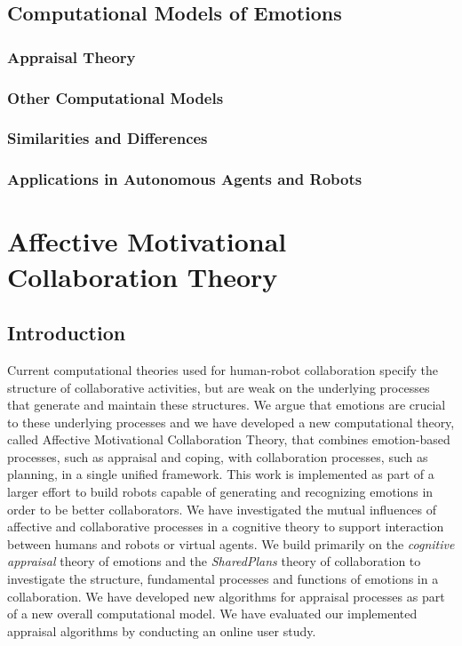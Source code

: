 \documentclass[12pt]{report}
\begin{document}
\section{Computational Models of Emotions}

\subsection{Appraisal Theory}

\subsection{Other Computational Models}

\subsection{Similarities and Differences}

\subsection{Applications in Autonomous Agents and Robots}

\chapter{Affective Motivational Collaboration Theory}
\label{ch:amct}

\section{Introduction}
Current computational theories used for human-robot collaboration specify the
structure of collaborative activities, but are weak on the underlying processes
that generate and maintain these structures. We argue that emotions are crucial
to these underlying processes and we have developed a new computational theory,
called Affective Motivational Collaboration Theory, that combines emotion-based
processes, such as appraisal and coping, with collaboration processes, such as
planning, in a single unified framework. This work is implemented as part of a
larger effort to build robots capable of generating and recognizing emotions in
order to be better collaborators. We have investigated the mutual influences of
affective and collaborative processes in a cognitive theory to support
interaction between humans and robots or virtual agents. We build primarily on
the \textit{cognitive appraisal} theory of emotions and the \textit{SharedPlans}
theory of collaboration to investigate the structure, fundamental processes and
functions of emotions in a collaboration. We have developed new algorithms for
appraisal processes as part of a new overall computational model. We have
evaluated our implemented appraisal algorithms by conducting an online user
study.
\end{document}

